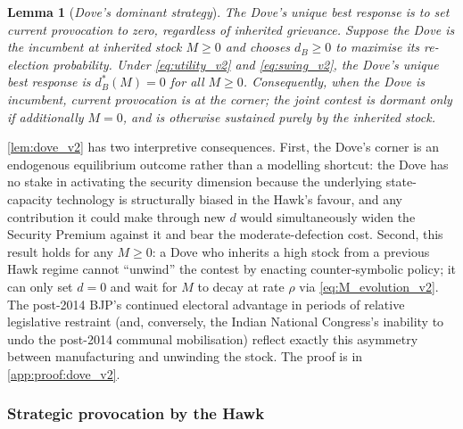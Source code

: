 \documentclass[11pt,twoside]{extarticle}
\newtheorem{lemma}{Lemma}
\begin{document}
\begin{lemma}[\emph{Dove's dominant strategy}]\label{lem:dove_v2}
\emph{The Dove's unique best response is to set current provocation to zero, regardless of inherited grievance.}
Suppose the Dove is the incumbent at inherited stock $M\ge 0$ and chooses $d_B\ge 0$ to maximise its re-election probability. Under \autoref{eq:utility_v2} and \autoref{eq:swing_v2}, the Dove's unique best response is $d_B^*(M)=0$ for all $M\ge 0$. Consequently, when the Dove is incumbent, current provocation is at the corner; the joint contest is dormant only if additionally $M=0$, and is otherwise sustained purely by the inherited stock.
\end{lemma}

\autoref{lem:dove_v2} has two interpretive consequences. First, the Dove's corner is an endogenous equilibrium outcome rather than a modelling shortcut: the Dove has no stake in activating the security dimension because the underlying state-capacity technology is structurally biased in the Hawk's favour, and any contribution it could make through new $d$ would simultaneously widen the Security Premium against it and bear the moderate-defection cost. Second, this result holds for any $M\ge 0$: a Dove who inherits a high stock from a previous Hawk regime cannot ``unwind'' the contest by enacting counter-symbolic policy; it can only set $d=0$ and wait for $M$ to decay at rate $\rho$ via \autoref{eq:M_evolution_v2}. The post-2014 BJP's continued electoral advantage in periods of relative legislative restraint (and, conversely, the Indian National Congress's inability to undo the post-2014 communal mobilisation) reflect exactly this asymmetry between manufacturing and unwinding the stock. The proof is in \autoref{app:proof:dove_v2}.

\subsubsection*{Strategic provocation by the Hawk}
\end{document}
